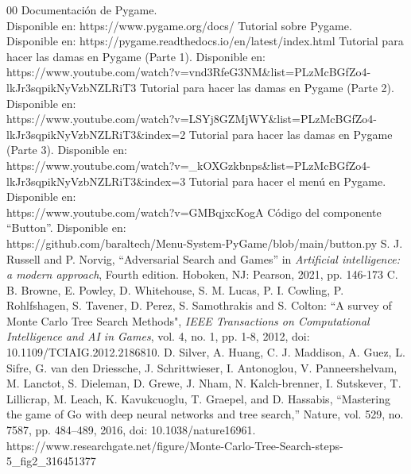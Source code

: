 \documentclass[conference,a4paper]{IEEEtran}
\begin{document}
\begin{thebibliography}{00}
 Documentación de Pygame. \\ Disponible en: https://www.pygame.org/docs/
 Tutorial sobre Pygame. \\ Disponible en: https://pygame.readthedocs.io/en/latest/index.html
 Tutorial para hacer las damas en Pygame (Parte 1). Disponible en:\\ https://www.youtube.com/watch?v=vnd3RfeG3NM\&list=PLzMcBGfZo4-lkJr3sqpikNyVzbNZLRiT3
 Tutorial para hacer las damas en Pygame (Parte 2). Disponible en:\\ https://www.youtube.com/watch?v=LSYj8GZMjWY\&list=PLzMcBGfZo4-lkJr3sqpikNyVzbNZLRiT3\&index=2
 Tutorial para hacer las damas en Pygame (Parte 3). Disponible en:\\ https://www.youtube.com/watch?v=\_kOXGzkbnps\&list=PLzMcBGfZo4-lkJr3sqpikNyVzbNZLRiT3\&index=3
 Tutorial para hacer el menú en Pygame. Disponible en:\\ https://www.youtube.com/watch?v=GMBqjxcKogA
 Código del componente ``Button''. Disponible en:\\ https://github.com/baraltech/Menu-System-PyGame/blob/main/button.py
 S. J. Russell and P. Norvig, ``Adversarial Search and Games'' in \textit{Artificial intelligence: a modern approach}, Fourth edition. Hoboken, NJ: Pearson, 2021, pp. 146-173
 C. B. Browne, E. Powley, D. Whitehouse, S. M. Lucas, P. I. Cowling, P. Rohlfshagen, S. Tavener, D. Perez, S. Samothrakis and S. Colton: ``A survey of Monte Carlo Tree Search Methods", \textit{IEEE Transactions on Computational Intelligence and AI in Games}, vol. 4, no. 1, pp. 1-8, 2012, doi: 10.1109/TCIAIG.2012.2186810.
 D. Silver, A. Huang, C. J. Maddison, A. Guez, L. Sifre, G. van den Driessche, J. Schrittwieser, I. Antonoglou, V. Panneershelvam, M. Lanctot, S. Dieleman, D. Grewe, J. Nham, N. Kalch-brenner, I. Sutskever, T. Lillicrap, M. Leach, K. Kavukcuoglu, T. Graepel, and D. Hassabis, “Mastering the game of Go with deep neural networks and tree search,” Nature, vol. 529, no. 7587, pp. 484–489, 2016, doi: 10.1038/nature16961.
 https://www.researchgate.net/figure/Monte-Carlo-Tree-Search-steps-5\_fig2\_316451377
\end{thebibliography}
\end{document}
